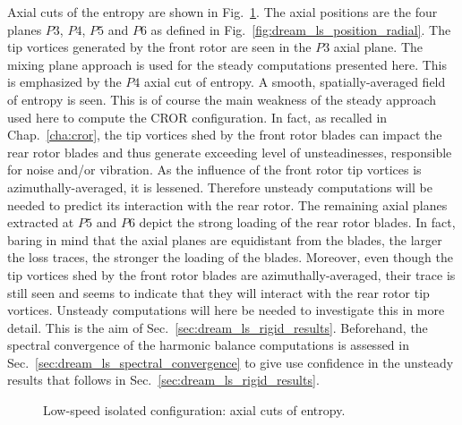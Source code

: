 Axial cuts of the entropy are shown in Fig.~\ref{fig:dream_ls_steady_entropy}.
The axial positions are the four planes $P3$, $P4$, $P5$
and $P6$ as defined in Fig.~\ref{fig:dream_ls_position_radial}.
The tip vortices generated by the front rotor are seen in the $P3$
axial plane. The mixing plane approach is used for the steady computations
presented here. This is emphasized by the $P4$ axial cut of entropy. A
smooth, spatially-averaged field of entropy is seen. This is of course the main
weakness of the steady approach used here to compute the CROR configuration.
In fact, as recalled in Chap.~\ref{cha:cror}, the tip vortices shed by the
front rotor blades can impact the rear rotor blades and thus generate
exceeding level of unsteadinesses, responsible for noise and/or vibration. As the influence
of the front rotor tip vortices is azimuthally-averaged, it is
lessened. Therefore unsteady computations will be needed to
predict its interaction with the rear rotor.
The remaining axial planes extracted at $P5$ and $P6$ depict the strong loading
of the rear rotor blades. In fact, baring in mind that the
axial planes are equidistant from the blades, the larger the loss traces,
the stronger the loading of the blades. Moreover, even though the
tip vortices shed by the front rotor 
blades are azimuthally-averaged,
their trace is still seen and seems to indicate that they will
interact with the rear rotor tip vortices. Unsteady computations will
here be needed to investigate this in more detail. This is the aim of Sec.~\ref{sec:dream_ls_rigid_results}.
Beforehand, the spectral convergence of the harmonic balance computations is assessed in 
Sec.~\ref{sec:dream_ls_spectral_convergence} to give use confidence in the unsteady results
that follows in Sec.~\ref{sec:dream_ls_rigid_results}.
\begin{figure}[htp]
  \centering
  \caption{Low-speed isolated configuration: axial cuts of entropy.}
   \label{fig:dream_ls_steady_entropy}
\end{figure}